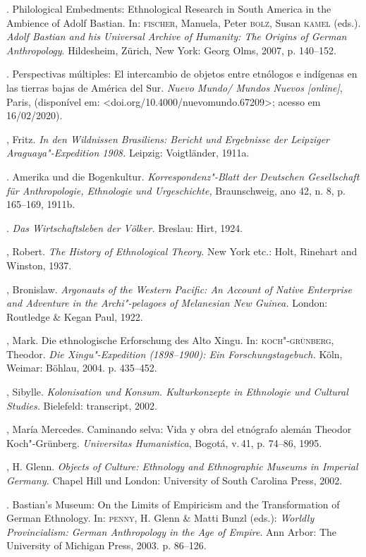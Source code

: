 \begin{bibliohedra}
\titidem. Philological Embedments: Ethnological Research in
South America in the Ambience of Adolf Bastian. In: \textsc{fischer}, Manuela,
Peter \textsc{bolz}, Susan \textsc{kamel} (eds.). \textit{Adolf Bastian and his Universal
Archive of Humanity: The Origins of German Anthropology}. Hildesheim,
Zürich, New York: Georg Olms, 2007, p. 140--152.

\titidem. Perspectivas múltiples: El intercambio de objetos
entre etnólogos e indígenas en las tierras bajas de América del Sur.
\textit{Nuevo Mundo/ Mundos Nuevos {[}online{]}}, Paris, (disponível
em: \textless{}doi.org/10.4000/nuevomundo.67209\textgreater{}; acesso em
16/02/2020).

, Fritz. \textit{In den Wildnissen Brasiliens: Bericht und
Ergebnisse der Leipziger Araguaya"-Expedition 1908.} Leipzig:
Voigtländer, 1911a.

\titidem. Amerika und die Bogenkultur.
\textit{Korrespondenz"-Blatt der Deutschen Gesellschaft für
Anthropologie, Ethnologie und Urgeschichte,} Braunschweig, ano 42, n.
8, p. 165--169, 1911b.

\titidem. \textit{Das Wirtschaftsleben der Völker.} Breslau:
Hirt, 1924.

, Robert. \textit{The History of Ethnological Theory.} New York
etc.: Holt, Rinehart and Winston, 1937.

, Bronislaw. \textit{Argonauts of the Western Pacific: An
Account of Native Enterprise and Adventure in the Archi"-pelagoes of
Melanesian New Guinea.} London: Routledge \& Kegan Paul, 1922.

, Mark. Die ethnologische Erforschung des Alto Xingu. In:
\textsc{koch"-grünberg}, Theodor. \textit{Die Xingu"-Expedition (1898--1900): Ein
Forschungstagebuch.} Köln, Weimar: Böhlau, 2004. p. 435--452.

, Sibylle. \textit{Kolonisation und Konsum. Kulturkonzepte in
Ethnologie und Cultural Studies.} Bielefeld: transcript, 2002.

, María Mercedes. Caminando selva: Vida y obra del
etnógrafo alemán Theodor Koch"-Grünberg. \textit{Universitas
Humanistica}, Bogotá, v.\,41, p. 74--86, 1995.

, H. Glenn. \textit{Objects of Culture: Ethnology and Ethnographic
Museums in Imperial Germany.} Chapel Hill und London: University of
South Carolina Press, 2002.

\titidem. Bastian's Museum: On the Limits of Empiricism and
the Transformation of German Ethnology. In: \textsc{penny}, H. Glenn \& Matti
Bunzl (eds.): \emph{Worldly Provincialism: German Anthropology in the
Age of Empire}. Ann Arbor: The University of Michigan Press, 2003. p.
86--126.


\end{bibliohedra}
